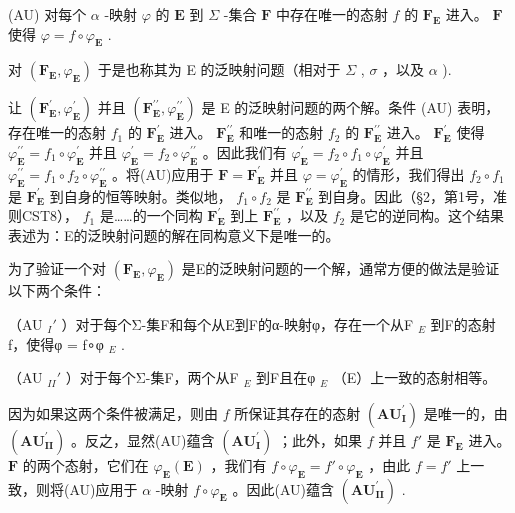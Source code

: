 (AU) 对每个 \(\alpha\) -映射 \(\varphi\) 的 \(\mathbf{E}\) 到 \(\Sigma\) -集合 \(\mathbf{F}\) 中存在唯一的态射 \(f\) 的 \(\mathbf{F}_{\mathbf{E}}\) 进入。 \(\mathbf{F}\) 使得 \(\varphi = f \circ \varphi_{\mathbf{E}}\) .

对 \((\mathbf{F}_{\mathbf{E}}, \varphi_{\mathbf{E}})\) 于是也称其为 E 的泛映射问题（相对于 \(\Sigma\) , \(\sigma\) ，以及 \(\alpha\) ).

让 \((\mathbf{F}_{\mathbf{E}}^{\prime},\varphi_{\mathbf{E}}^{\prime})\) 并且 \((\mathbf{F}_{\mathbf{E}}^{\prime \prime},\varphi_{\mathbf{E}}^{\prime \prime})\) 是 E 的泛映射问题的两个解。条件 (AU) 表明，存在唯一的态射 \(f_{1}\) 的 \(\mathbf{F}_{\mathbf{E}}^{\prime}\) 进入。 \(\mathbf{F}_{\mathbf{E}}^{\prime \prime}\) 和唯一的态射 \(f_{2}\) 的 \(\mathbf{F}_{\mathbf{E}}^{\prime \prime}\) 进入。 \(\mathbf{F}_{\mathbf{E}}^{\prime}\) 使得 \(\varphi_{\mathbf{E}}^{\prime \prime} = f_{1}\circ \varphi_{\mathbf{E}}^{\prime}\) 并且 \(\varphi_{\mathbf{E}}^{\prime} = f_{2}\circ \varphi_{\mathbf{E}}^{\prime \prime}\) 。因此我们有 \(\varphi_{\mathbf{E}}^{\prime} = f_{2}\circ f_{1}\circ \varphi_{\mathbf{E}}^{\prime}\) 并且 \(\varphi_{\mathbf{E}}^{\prime \prime} = f_{1}\circ f_{2}\circ \varphi_{\mathbf{E}}^{\prime \prime}\) 。将(AU)应用于 \(\mathbf{F} = \mathbf{F}_{\mathbf{E}}^{\prime}\) 并且 \(\varphi = \varphi_{\mathbf{E}}^{\prime}\) 的情形，我们得出 \(f_{2}\circ f_{1}\) 是 \(\mathbf{F}_{\mathbf{E}}^{\prime}\) 到自身的恒等映射。类似地， \(f_{1}\circ f_{2}\) 是 \(\mathbf{F}_{\mathbf{E}}^{\prime \prime}\) 到自身。因此（§2，第1号，准则CST8）， \(f_{1}\) 是……的一个同构 \(\mathbf{F}_{\mathbf{E}}^{\prime}\) 到上 \(\mathbf{F}_{\mathbf{E}}^{\prime \prime}\) ，以及 \(f_{2}\) 是它的逆同构。这个结果表述为：E的泛映射问题的解在同构意义下是唯一的。

为了验证一个对 \((\mathbf{F}_{\mathbf{E}}, \varphi_{\mathbf{E}})\) 是E的泛映射问题的一个解，通常方便的做法是验证以下两个条件：

（AU \(_{I}'\) ）对于每个Σ-集F和每个从E到F的α-映射φ，存在一个从F \(_{E}\) 到F的态射f，使得φ = f∘φ \(_{E}\) .

（AU \(_{II}'\) ）对于每个Σ-集F，两个从F \(_{E}\) 到F且在φ \(_{E}\) （E）上一致的态射相等。

因为如果这两个条件被满足，则由 \(f\) 所保证其存在的态射 \((\mathbf{AU}_{\mathbf{I}}^{\prime})\) 是唯一的，由 \((\mathbf{AU}_{\mathbf{II}}^{\prime})\) 。反之，显然(AU)蕴含 \((\mathbf{AU}_{\mathbf{I}}^{\prime})\) ；此外，如果 \(f\) 并且 \(f'\) 是 \(\mathbf{F}_{\mathbf{E}}\) 进入。 \(\mathbf{F}\) 的两个态射，它们在 \(\varphi_{\mathbf{E}}(\mathbf{E})\) ，我们有 \(f \circ \varphi_{\mathbf{E}} = f' \circ \varphi_{\mathbf{E}}\) ，由此 \(f = f'\) 上一致，则将(AU)应用于 \(\alpha\) -映射 \(f \circ \varphi_{\mathbf{E}}\) 。因此(AU)蕴含 \((\mathbf{AU}_{\mathbf{II}}^{\prime})\) .


